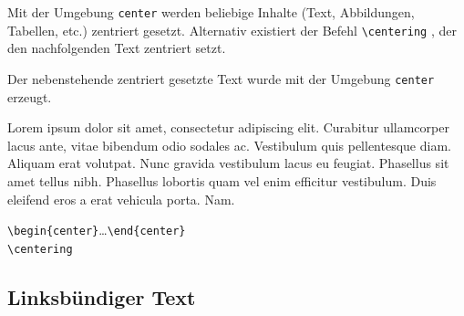 \documentclass[a4paper,10pt,twoside]{scrbook}
\begin{document}
\begin{minipage}[t]{0.48\textwidth}
\setlength{\parskip}{1em}
\frenchspacing
Mit der Umgebung \verb!center!  
werden beliebige Inhalte (Text, Abbildungen, Tabellen, etc.) zentriert gesetzt.
Alternativ existiert der Befehl \verb!\centering!  , der den 
nachfolgenden
Text zentriert setzt. 

Der nebenstehende zentriert gesetzte Text wurde mit der Umgebung \verb!center! erzeugt.
\end{minipage}
\hfill
\begin{minipage}[t]{0.48\textwidth}
\setlength{\parskip}{1em}
\frenchspacing
\begin{center}
Lorem ipsum dolor sit amet, consectetur adipiscing elit. Curabitur ullamcorper lacus ante, vitae bibendum odio sodales ac. Vestibulum quis pellentesque diam. Aliquam erat volutpat. Nunc gravida vestibulum lacus eu feugiat. Phasellus sit amet tellus nibh. Phasellus lobortis quam vel enim efficitur vestibulum. Duis eleifend eros a erat vehicula porta. Nam.
\end{center}
\end{minipage}



\begin{boxedminipage}{\textwidth}
\texttt{\textbackslash begin\{center\}}\dots\texttt{\textbackslash end\{center\}}\\
\texttt{\textbackslash centering} 
\end{boxedminipage}



\subsection{Linksbündiger Text}
\end{document}
